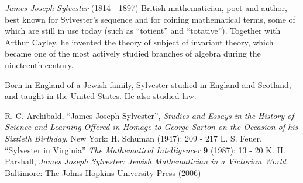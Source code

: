\documentclass[12pt]{article}
\begin{document}
\emph{James Joseph Sylvester} (1814 - 1897) British mathematician, poet and author, best known for Sylvester's sequence and for coining mathematical terms, some of which are still in use today (such as ``totient'' and ``totative'').
Together with Arthur Cayley, he invented the theory of subject of invariant theory, which became one of the
most actively studied branches of algebra during the nineteenth century. 

Born in England of a Jewish family, Sylvester studied in England and Scotland, and taught in the United States. He also studied law.

\begin{thebibliography}{3}
 R. C. Archibald, ``James Joseph Sylvester'', {\it Studies and Essays in the History of Science and Learning Offered in Homage to George Sarton on the Occasion of his Sixtieth Birthday}. New York: H. Schuman (1947): 209 - 217
 L. S. Feuer, ``Sylvester in Virginia'' {\it The Mathematical Intelligencer} {\bf 9} (1987): 13 - 20
 K. H. Parshall, {\it James Joseph Sylvester: Jewish Mathematician in a Victorian World}. Baltimore: The Johns Hopkins University Press (2006)
\end{thebibliography}
\end{document}

